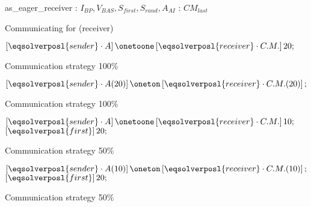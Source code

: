 \begin{algorithm}
\dontprintsemicolon
\SetNoline
{}
   as\_eager\_receiver\;
\algoindent {} : $I_{BP}, V_{BAS}, S_{first}, S_{rand}, A_{AI}$ \;
\algoindent {} : $CM_{last}$
\caption{Communicating \as{} for \SGP{} (receiver)}\label{as:golfers_receiver}
\end{algorithm}

\begin{algorithm}
\dontprintsemicolon
\SetNoline
$\left[\eqsolverposl{sender}\cdot A\right] \onetoone \left[\eqsolverposl{receiver}\cdot C.M.\right]20;$
\caption{Communication strategy \oneTone{} 100\%}\label{comm:golfers_1_1-1}
\end{algorithm}

\begin{algorithm}
\dontprintsemicolon
\SetNoline
$\left[\eqsolverposl{sender}\cdot A(20)\right] \oneton \left[\eqsolverposl{receiver}\cdot C.M.(20)\right];$
\caption{Communication strategy \oneTn{} 100\%}\label{comm:golfers_1_1-n}
\end{algorithm}

\begin{algorithm}
\dontprintsemicolon
\SetNoline
$\left[\eqsolverposl{sender}\cdot A\right] \onetoone \left[\eqsolverposl{receiver}\cdot C.M.\right]10;$\;
$\left[\eqsolverposl{first}\right]20;$
\caption{Communication strategy \oneTone{} 50\%}\label{comm:golfers_1_1-1_50}
\end{algorithm}

\begin{algorithm}
\dontprintsemicolon
\SetNoline
$\left[\eqsolverposl{sender}\cdot A(10)\right] \oneton \left[\eqsolverposl{receiver}\cdot C.M.(10)\right];$\;
$\left[\eqsolverposl{first}\right]20;$
\caption{Communication strategy \oneTn{} 50\%}\label{comm:golfers_1_1-n_50}
\end{algorithm}

